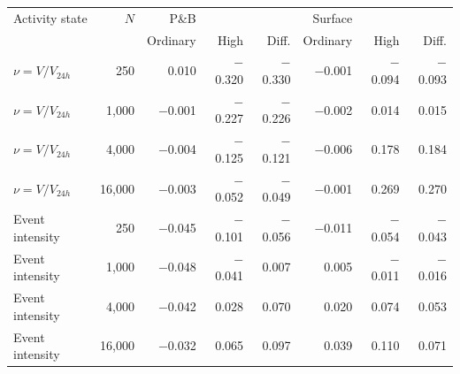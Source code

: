 \begin{tabular}{lrrrrrrr}
\toprule
Activity state & \(N\) & P\&B &  &  & Surface &  &  \\
 &  & Ordinary & High & Diff. & Ordinary & High & Diff. \\
\midrule
\(\nu=V/V_{24h}\) & 250 & 0.010 & $-$0.320 & $-$0.330 & $-$0.001 & $-$0.094 & $-$0.093 \\
\(\nu=V/V_{24h}\) & 1,000 & $-$0.001 & $-$0.227 & $-$0.226 & $-$0.002 & 0.014 & 0.015 \\
\(\nu=V/V_{24h}\) & 4,000 & $-$0.004 & $-$0.125 & $-$0.121 & $-$0.006 & 0.178 & 0.184 \\
\(\nu=V/V_{24h}\) & 16,000 & $-$0.003 & $-$0.052 & $-$0.049 & $-$0.001 & 0.269 & 0.270 \\
\addlinespace
Event intensity & 250 & $-$0.045 & $-$0.101 & $-$0.056 & $-$0.011 & $-$0.054 & $-$0.043 \\
Event intensity & 1,000 & $-$0.048 & $-$0.041 & 0.007 & 0.005 & $-$0.011 & $-$0.016 \\
Event intensity & 4,000 & $-$0.042 & 0.028 & 0.070 & 0.020 & 0.074 & 0.053 \\
Event intensity & 16,000 & $-$0.032 & 0.065 & 0.097 & 0.039 & 0.110 & 0.071 \\
\bottomrule
\end{tabular}
